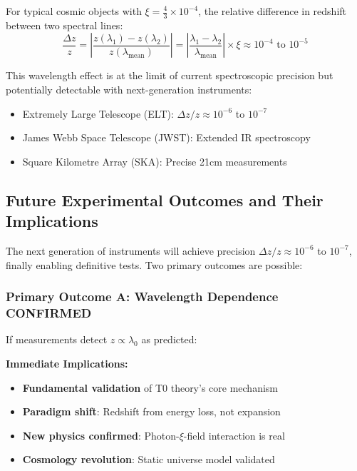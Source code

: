 \documentclass[12pt,a4paper]{article}
\newcommand{\xiconst}{\xi = \frac{4}{3} \times 10^{-4}}
\theoremstyle{definition}
\begin{document}
	For typical cosmic objects with $\xiconst$, the relative difference in redshift between two spectral lines:
	\begin{equation}
		\frac{\Delta z}{z} = \left| \frac{z(\lambda_1) - z(\lambda_2)}{z(\lambda_{\text{mean}})} \right| = \left| \frac{\lambda_1 - \lambda_2}{\lambda_{\text{mean}}} \right| \times \xi \approx 10^{-4} \text{ to } 10^{-5}
	\end{equation}
	
	\begin{important}
		This wavelength effect is at the limit of current spectroscopic precision but potentially detectable with next-generation instruments:
		\begin{itemize}
			\item Extremely Large Telescope (ELT): $\Delta z/z \approx 10^{-6}$ to $10^{-7}$
			\item James Webb Space Telescope (JWST): Extended IR spectroscopy
			\item Square Kilometre Array (SKA): Precise 21cm measurements
		\end{itemize}
	\end{important}
	
	\subsection{Future Experimental Outcomes and Their Implications}
	
	The next generation of instruments will achieve precision $\Delta z/z \approx 10^{-6}$ to $10^{-7}$, finally enabling definitive tests. Two primary outcomes are possible:
	
	\subsubsection{Primary Outcome A: Wavelength Dependence CONFIRMED}
	\label{subsubsec:confirmed}
	
	If measurements detect $z \propto \lambda_0$ as predicted:
	
	\textbf{Immediate Implications:}
	\begin{itemize}
		\item \textbf{Fundamental validation} of T0 theory's core mechanism
		\item \textbf{Paradigm shift}: Redshift from energy loss, not expansion
		\item \textbf{New physics confirmed}: Photon-$\xi$-field interaction is real
		\item \textbf{Cosmology revolution}: Static universe model validated
	\end{itemize}
	
\end{document}
